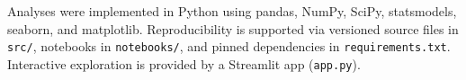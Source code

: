Analyses were implemented in Python using pandas, NumPy, SciPy, statsmodels, seaborn, and matplotlib. Reproducibility is supported via versioned source files in \texttt{src/}, notebooks in \texttt{notebooks/}, and pinned dependencies in \texttt{requirements.txt}. Interactive exploration is provided by a Streamlit app (\texttt{app.py}).
